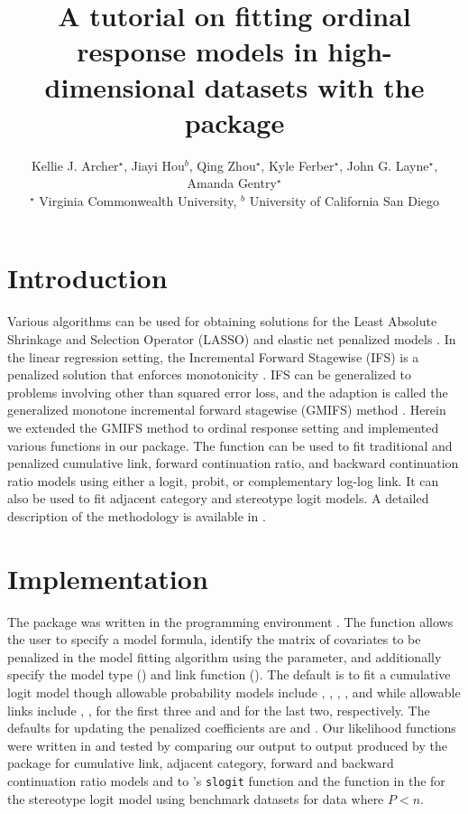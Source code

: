 \documentclass[article, shortclass, nojss]{jss}
\title{A tutorial on fitting ordinal response models in high-dimensional datasets with the\pkg{ordinalgmifs} package}
\author{Kellie J. Archer$^\star$,  Jiayi Hou$^b$, Qing Zhou$^\star$,  Kyle Ferber$^\star$,  John G. Layne$^\star$,  Amanda Gentry$^\star$\\
$^\star$ Virginia Commonwealth University,
$^b$ University of California San Diego}
\begin{document}
\section{Introduction}
Various algorithms can be used for obtaining solutions for the Least Absolute Shrinkage and Selection Operator (LASSO) \cite{Tibs1996, Tibs1997} and elastic net penalized models \cite{Zou}. In the linear regression setting, the Incremental Forward Stagewise (IFS) is a penalized solution that enforces monotonicity \cite{Hastie}. IFS can be generalized to problems involving other than squared error loss, and the adaption is called the generalized monotone incremental forward stagewise (GMIFS) method \cite{Hastie}. Herein we extended the GMIFS method  \cite{Hastie} to ordinal response setting and implemented various functions in our   package. The  function can be used to fit traditional and penalized cumulative link, forward continuation ratio, and backward continuation ratio models using either a logit, probit, or complementary log-log link. It can also be used to fit adjacent category and stereotype logit models. A detailed description of the methodology is available in \cite{ArcherCI}.

\section{Implementation}
The  package was written in the  programming environment \cite{RTeam}.  The  function allows the user to specify a model formula, identify the matrix of covariates to be penalized in the model fitting algorithm using the  parameter, and additionally specify the model type () and link function (). The default is to fit a cumulative logit model though allowable probability models include , , , , and  while allowable links include , ,  for the first three and  and  for the last two, respectively. The defaults for updating the penalized coefficients are  and . Our likelihood functions were written in  and  tested by comparing our  output to output produced by the    package for cumulative link, adjacent category, forward and backward continuation ratio models and to 's \texttt{slogit} function and the  function in the   for the stereotype logit model using benchmark datasets for data where $P<n$.
\end{document}
